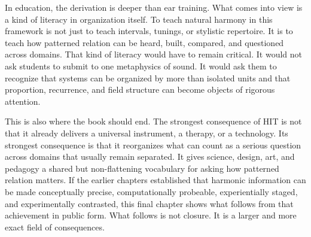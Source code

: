 In education, the derivation is deeper than ear training. What comes into view is a kind of literacy in organization itself. To teach natural harmony in this framework is not just to teach intervals, tunings, or stylistic repertoire. It is to teach how patterned relation can be heard, built, compared, and questioned across domains. That kind of literacy would have to remain critical. It would not ask students to submit to one metaphysics of sound. It would ask them to recognize that systems can be organized by more than isolated units and that proportion, recurrence, and field structure can become objects of rigorous attention.

This is also where the book should end. The strongest consequence of HIT is not that it already delivers a universal instrument, a therapy, or a technology. Its strongest consequence is that it reorganizes what can count as a serious question across domains that usually remain separated. It gives science, design, art, and pedagogy a shared but non-flattening vocabulary for asking how patterned relation matters. If the earlier chapters established that harmonic information can be made conceptually precise, computationally probeable, experientially staged, and experimentally contrasted, this final chapter shows what follows from that achievement in public form. What follows is not closure. It is a larger and more exact field of consequences.
